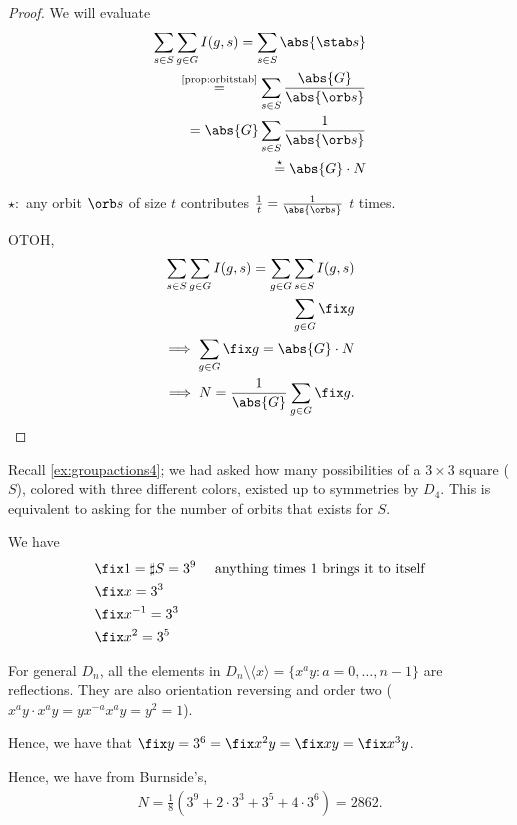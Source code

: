 \documentclass[12pt,oneside]{article}
\begin{document}
\begin{proof}
  We will evaluate \begin{align*}
    \sum_{s \in S} \sum_{g \in G} I(g, s) = \sum_{s\in S}\abs{\stab s}\\
    \overset{\text{\cref{prop:orbitstab}}}{=} \sum_{s\in S}\frac{\abs{G}}{\abs{\orb s}}\\
    = \abs{G}\sum_{s\in S} \frac{1}{\abs{\orb s}}\\
    \overset{\star}{=} \abs{G}\cdot  N
  \end{align*}

  $\star:$ any orbit $\orb s$ of size $t$ contributes $\frac{1}{t} = \frac{1}{\abs{\orb s}}$ $t$ times.


  OTOH, \begin{align*}
    \sum_{s\in S} \sum_{g\in G}I(g,s) =  \sum_{g\in G}\sum_{s\in S} I(g,s)\\
    \sum_{g \in G} \fix g\\
    \implies \sum_{g \in G} \fix g = \abs{G}\cdot  N\\
    \implies N = \frac{1}{\abs{G}} \sum_{g \in G} \fix g. 
  \end{align*}
\end{proof}


\begin{remark}
  Recall \cref{ex:groupactions4}; we had asked how many possibilities of a $3 \times 3$ square ($S$), colored with three different colors, existed up to symmetries by $D_4$. This is equivalent to asking for the number of orbits that exists for $S$. 

  We have \begin{align*}
    &\fix 1 = \sharp S = 3^9 \quad \text{ anything times 1 brings it to itself}\\
    &\fix x = 3^3 \quad \text{ }\\
    &\fix x^{-1} = 3^3\\
    &\fix x^2 = 3^5
   \end{align*}

  For general $D_n$, all the elements in $D_n \setminus \langle x\rangle = \{x^ay: a = 0, \dots, n - 1\}$ are reflections. They are also orientation reversing and order two ($x^{a}y \cdot x^a y = y x^{-a}x^a y = y^2 = 1$).

  Hence, we have that $\fix y = 3^6 = \fix x^2 y = \fix xy = \fix x^3 y$.

  Hence, we have from Burnside's, \begin{align*}
    N = \frac{1}{8} \left(3^9 + 2 \cdot 3^3 + 3^5 + 4 \cdot 3^6\right) = 2862.
  \end{align*}
\end{remark}
\end{document}
